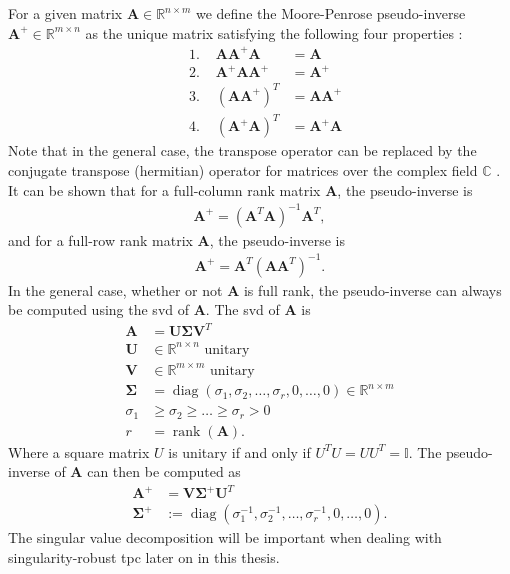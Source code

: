 For a given matrix $\bm{A} \in \mathbb{R}^{n\times m}$ we define the Moore-Penrose
pseudo-inverse $\bm{A}^{+} \in \mathbb{R}^{m\times n}$ as the unique matrix
satisfying the following four properties \cite{penrose1955}:
\begin{subequations}
    \begin{align}
        &\textrm{1. } & \bm{A}\bm{A}^{+}\bm{A} &= \bm{A} \\
        &\textrm{2. } & \bm{A}^{+}\bm{A}\bm{A}^{+} &= \bm{A}^{+} \\
        &\textrm{3. } & (\bm{A}\bm{A}^{+})^T &= \bm{A}\bm{A}^{+} \\
        &\textrm{4. } & (\bm{A}^{+}\bm{A})^T &= \bm{A}^{+}\bm{A}
    \end{align}
\end{subequations}
Note that in the general case, the transpose operator can be replaced by the
conjugate transpose (hermitian) operator for matrices over the complex field $\mathbb{C}$ \cite{penrose1955}.
It can be shown that for a full-column rank matrix $\bm{A}$, the pseudo-inverse is
\begin{align}
    \bm{A}^{+} = (\bm{A}^T \bm{A})^{-1} \bm{A}^T,
\end{align}
and for a full-row rank matrix $\bm{A}$, the pseudo-inverse is
\begin{align}
    \bm{A}^{+} = \bm{A}^T (\bm{A} \bm{A}^T)^{-1}.
\end{align}
In the general case, whether or not $\bm{A}$ is full rank, the pseudo-inverse can always
be computed using the \gls{svd} of $\bm{A}$. The \gls{svd} of $\bm{A}$ is
\begin{subequations}
\begin{align}
    \bm{A} &= \bm{U} \bm{\Sigma} \bm{V}^T \\
    \bm{U} &\in \mathbb{R}^{n\times n} \textrm{ unitary} \\
    \bm{V} &\in \mathbb{R}^{m\times m} \textrm{ unitary} \\
    \bm{\Sigma} &= \operatorname{diag}(\sigma_1, \sigma_2, \ldots, \sigma_r, 0, \ldots, 0) \in \mathbb{R}^{n\times m} \\
    \sigma_1 &\geq \sigma_2 \geq \ldots \geq \sigma_r > 0 \\
    r &= \operatorname{rank}(\bm{A}).
\end{align}
\end{subequations}
Where a square matrix $U$ is unitary if and only if $U^T U = U U^T = \mathbb{I}$. The pseudo-inverse
of $\bm{A}$ can then be computed as
\begin{subequations}
\begin{align}
    \bm{A}^{+} &= \bm{V} \bm{\Sigma}^{+} \bm{U}^T \\
    \bm{\Sigma}^{+} &:= \operatorname{diag}(\sigma_1^{-1}, \sigma_2^{-1}, \ldots, \sigma_r^{-1}, 0, \ldots, 0).
\end{align}
\end{subequations}
The singular value decomposition will be important when dealing with
singularity-robust \gls{tpc} later on in this thesis.

